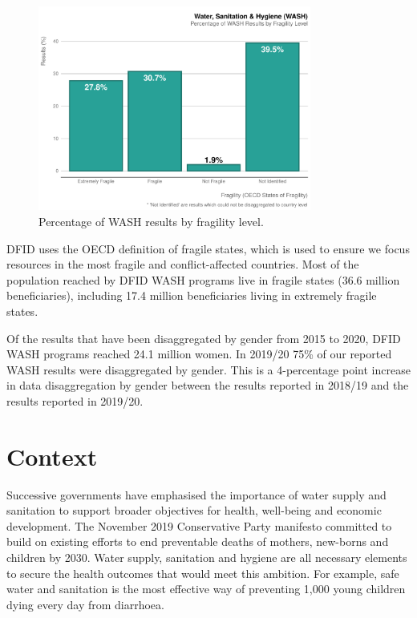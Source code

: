 \begin{figure}[htbp]
	\centering
\begin{knitrout}
\color{fgcolor}
\includegraphics[width=0.8\textwidth]{figs/wash_fragility_plot-1} 

\end{knitrout}
	\caption{Percentage of WASH results by fragility level.}
	\label{fig:wash_fragility_plot}
\end{figure}

DFID uses the OECD definition of fragile states, which is used to ensure we focus resources in the most fragile and conflict-affected countries. %
Most of the population reached by DFID WASH programs live in fragile states (36.6 million beneficiaries), including 17.4 million beneficiaries living in extremely fragile states. %

Of the results that have been disaggregated by gender from 2015 to 2020, DFID WASH programs reached 24.1 million women. %
In 2019/20 75\% of our reported WASH results were disaggregated by gender. %
This is a 4-percentage point increase in data disaggregation by gender between the results reported in 2018/19 and the results reported in 2019/20. %

\section{Context}
Successive governments have emphasised the importance of water supply and sanitation to support broader objectives for health, well-being and economic development. %
The November 2019 Conservative Party manifesto committed to build on existing efforts to end preventable deaths of mothers, new-borns and children  by 2030. %
Water supply, sanitation and hygiene are all necessary elements to secure the health outcomes that would meet this ambition. %
For example, safe water and sanitation is the most effective way of preventing 1,000 young children dying every day from diarrhoea. %

